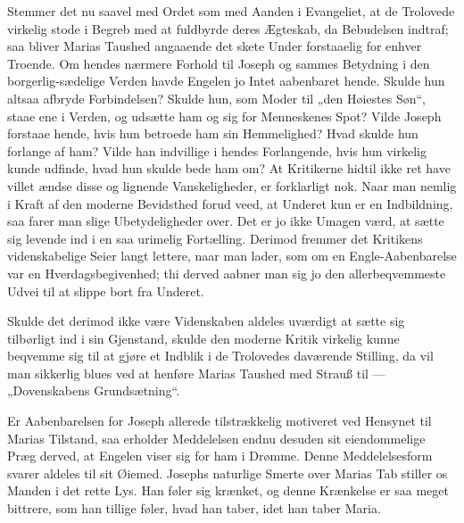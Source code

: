 \documentclass[12pt,a4paper]{book}
\begin{document}
{Stemmer det nu saavel med Ordet som med Aanden i Evangeliet, at de Trolovede
virkelig stode i Begreb med at fuldbyrde deres Ægteskab, da Bebudelsen indtraf;
saa bliver Marias Taushed angaaende det skete Under forstaaelig for enhver
Troende. Om hendes nærmere Forhold til Joseph og sammes Betydning i den
borgerlig-sædelige Verden havde Engelen jo Intet aabenbaret hende. Skulde hun
altsaa afbryde Forbindelsen? Skulde hun, som Moder til „den Høiestes Søn“, staae
ene i Verden, og udsætte ham og sig for Menneskenes Spot? Vilde Joseph forstaae
hende, hvis hun betroede ham sin Hemmelighed? Hvad skulde hun forlange af ham?
Vilde han indvillige i hendes Forlangende, hvis hun virkelig kunde udfinde, hvad
hun skulde bede ham om? At Kritikerne hidtil ikke ret have villet ændse disse og
lignende Vanskeligheder, er forklarligt nok. Naar man nemlig i Kraft af den
moderne Bevidsthed forud veed, at Underet kun er en Indbildning, saa farer man
slige Ubetydeligheder over. Det er jo ikke Umagen værd, at sætte sig levende ind
i en saa urimelig Fortælling. Derimod fremmer det Kritikens videnskabelige Seier
langt lettere, naar man lader, som om en Engle-Aabenbarelse var en
Hverdagsbegivenhed; thi derved aabner man sig jo den allerbeqvemmeste Udvei til
at slippe bort fra Underet.

Skulde det derimod ikke være Videnskaben aldeles uværdigt at sætte sig
tilbørligt ind i sin Gjenstand, skulde den moderne Kritik virkelig kunne
beqvemme sig til at gjøre et Indblik i de Trolovedes daværende Stilling, da vil
man sikkerlig blues ved at henføre Marias Taushed med Strauß til ---
„Dovenskabens Grundsætning“.

Er Aabenbarelsen for Joseph allerede tilstrækkelig motiveret ved Hensynet til
Marias Tilstand, saa erholder Meddelelsen endnu desuden sit eiendommelige Præg
derved, at Engelen viser sig for ham i Drømme. Denne Meddelelsesform svarer
aldeles til sit Øiemed. Josephs naturlige Smerte over Marias Tab stiller os
Manden i det rette Lys. Han føler sig krænket, og denne Krænkelse er saa meget
bittrere, som han tillige føler, hvad han taber, idet han taber Maria.

}
\end{document}
